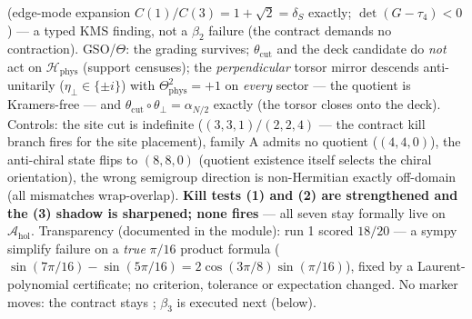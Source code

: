 \documentclass[11pt,a4paper]{article}
\begin{document}
(edge-mode expansion $C(1)/C(3) = 1 + \sqrt2 = \delta_S$ exactly; $\det(G - \tau_4) < 0$) ---
a typed KMS finding, not a $\beta_2$ failure (the contract demands no contraction).
GSO/$\Theta$: the grading survives; $\theta_{\mathrm{cut}}$ and the deck candidate do
\emph{not} act on $\mathcal H_{\mathrm{phys}}$ (support censuses); the \emph{perpendicular}
torsor mirror descends anti-unitarily ($\eta_\perp \in \{\pm i\}$) with
$\Theta_{\mathrm{phys}}^2 = +1$ on \emph{every} sector --- the quotient is Kramers-free ---
and $\theta_{\mathrm{cut}}\circ\theta_\perp = \alpha_{N/2}$ exactly (the torsor closes onto
the deck). Controls: the site cut is indefinite ($(3,3,1)/(2,2,4)$ --- the contract kill
branch fires for the site placement), family A admits no quotient ($(4,4,0)$), the
anti-chiral state flips to $(8,8,0)$ (quotient existence itself selects the chiral
orientation), the wrong semigroup direction is non-Hermitian exactly off-domain (all
mismatches wrap-overlap). \textbf{Kill tests (1) and (2) are strengthened and the (3) shadow
is sharpened; none fires} --- all seven stay formally live on
$\mathcal A_{\mathrm{hol}}$. Transparency (documented in the module): run 1 scored $18/20$
--- a sympy simplify failure on a \emph{true} $\pi/16$ product formula
($\sin(7\pi/16) - \sin(5\pi/16) = 2\cos(3\pi/8)\sin(\pi/16)$), fixed by a Laurent-polynomial
certificate; no criterion, tolerance or expectation changed. No marker moves: the contract
stays \mO; $\beta_3$ is executed next (below).
\end{document}

